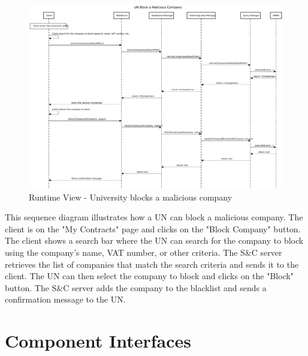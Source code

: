 \begin{figure}[H]
      \centering
      \includegraphics[width=1.0\textwidth]{Images/RV_14.pdf}
      \caption{Runtime View - University blocks a malicious company}
      \label{fig:rv-un-blocks-company}
\end{figure}

\par This sequence diagram illustrates how a UN can block a malicious company. The client is on the "My Contracts" page
and clicks on the "Block Company" button. The client shows a search bar where the UN can search for the company to
block using the company's name, VAT number, or other criteria. The S\&C server retrieves the list of companies that
match the search criteria and sends it to the client. The UN can then select the company to block and clicks on the
"Block" button. The S\&C server adds the company to the blacklist and sends a confirmation message to the UN.

\section{Component Interfaces}
\label{sec:component-interfaces}%

